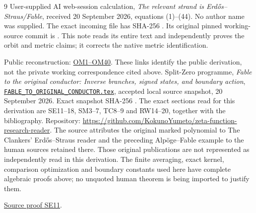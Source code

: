 \documentclass[11pt]{article}
\begin{document}
\begin{thebibliography}{9}
User-supplied AI web-session calculation,
\emph{The relevant strand is Erd\H{o}s--Straus/Fable},
received 20 September 2026, equations (1)--(44).
No author name was supplied.
The exact incoming file has SHA-256
.
Its original pinned working-source commit is
.
This note reads its entire text and independently proves the
orbit and metric claims; it corrects the native metric identification.


Public reconstruction: \href{https://github.com/KokunoYumeto/zeta-function-research-reader/blob/689a8f87e9c12b7a99b01b3123438c6751ee608f/workbenches/splitzero-tandem/continuations/20260920-native-secular-frame/ORBIT_METRIC_DERIVATION.tex\#L38}{OM1--OM40}. These links identify the public derivation, not the private working correspondence cited above.
Split-Zero programme,
\emph{Fable to the original conductor: Inverse branches, signed
states, and boundary action},
\href{https://github.com/KokunoYumeto/zeta-function-research-reader/blob/5992ad50c0f2a06921f1fcaded7b4e38097c0739/workbenches/splitzero-tandem/continuations/20260920-original-kernel-mixed-determinants/providers/FABLE_TO_ORIGINAL_CONDUCTOR.tex\#L1}{\texttt{FABLE\_TO\_ORIGINAL\_CONDUCTOR.tex}},
accepted local source snapshot, 20 September 2026.
Exact snapshot SHA-256
.
The exact sections read for this derivation are SE11--18,
SM3--7, TC8--9 and RW14--20, together with the bibliography.
Repository:
\url{https://github.com/KokunoYumeto/zeta-function-research-reader}.
The source attributes the original marked polynomial to
The Clankers' Erd\H{o}s--Straus reader and the preceding
Alp\"oge--Fable example to the human sources retained there.
Those original publications are not represented as independently
read in this derivation.  The finite averaging, exact kernel,
comparison optimization and boundary constants used here have
complete algebraic proofs above; no unquoted human theorem is
being imported to justify them.

\href{https://github.com/KokunoYumeto/zeta-function-research-reader/blob/5992ad50c0f2a06921f1fcaded7b4e38097c0739/workbenches/splitzero-tandem/continuations/20260920-original-kernel-mixed-determinants/providers/FABLE_TO_ORIGINAL_CONDUCTOR.tex\#L1967}{Source proof SE11}.
\end{thebibliography}
\end{document}
